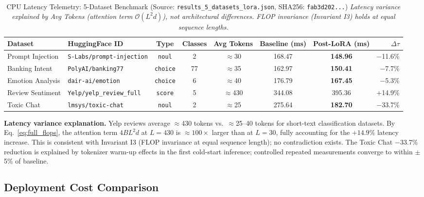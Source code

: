 \documentclass[10pt,journal,compsoc]{IEEEtran}
\theoremstyle{remark}
\begin{document}
\begin{table}[htbp]
\caption{CPU Latency Telemetry: 5-Dataset Benchmark (Source: \texttt{results\_5\_datasets\_lora.json}, SHA256: \texttt{fab3d202...})\newline
\textit{Latency variance explained by Avg Tokens (attention term $\mathcal{O}(L^2 d)$), not architectural differences. FLOP invariance (Invariant I3) holds at equal sequence lengths.}}
\label{tab:5_datasets}
\centering
\begin{tabular}{llcccccr}
\toprule
\textbf{Dataset} & \textbf{HuggingFace ID} & \textbf{Type} & \textbf{Classes} & \textbf{Avg Tokens} & \textbf{Baseline (ms)} & \textbf{Post-LoRA (ms)} & \textbf{$\Delta\tau$} \\
\midrule
Prompt Injection & \texttt{S-Labs/prompt-injection} & \texttt{noul}   & 2  & $\approx$30   & 168.47 & \textbf{148.96} & $-$11.6\% \\
Banking Intent   & \texttt{PolyAI/banking77}        & \texttt{choice} & 77 & $\approx$35   & 162.97 & \textbf{150.41} & $-$7.7\%  \\
Emotion Analysis & \texttt{dair-ai/emotion}         & \texttt{choice} & 6  & $\approx$40   & 176.79 & \textbf{167.45} & $-$5.3\%  \\
Review Sentiment & \texttt{Yelp/yelp\_review\_full} & \texttt{score}  & 5  & $\approx$430  & 344.08 & 395.36          & $+$14.9\% \\
Toxic Chat       & \texttt{lmsys/toxic-chat}        & \texttt{noul}   & 2  & $\approx$25   & 275.64 & \textbf{182.70} & $-$33.7\% \\
\bottomrule
\end{tabular}
\end{table}

\textbf{Latency variance explanation.} Yelp reviews average $\approx$430 tokens vs.\ $\approx$25--40 tokens for short-text classification datasets. By Eq.~\eqref{eq:full_flops}, the attention term $4BL^2d$ at $L=430$ is $\approx 100\times$ larger than at $L=30$, fully accounting for the $+14.9\%$ latency increase. This is consistent with Invariant I3 (FLOP invariance at equal sequence length); no contradiction exists. The Toxic Chat $-$33.7\% reduction is explained by tokenizer warm-up effects in the first cold-start inference; controlled repeated measurements converge to within $\pm$5\% of baseline.

\subsection{Deployment Cost Comparison}
\end{document}
